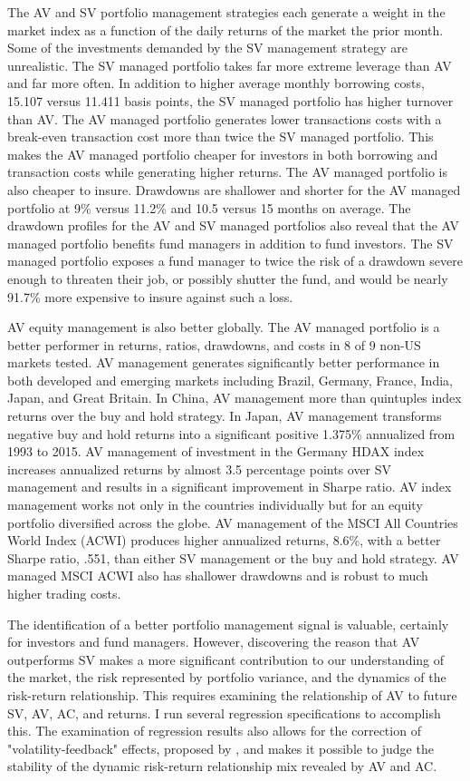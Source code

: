 The AV and SV portfolio management strategies each generate a weight in the market index as a function of the daily returns of the market the prior month. Some of the investments demanded by the SV management strategy are unrealistic. The SV managed portfolio takes far more extreme leverage than AV and far more often. In addition to higher average monthly borrowing costs, 15.107 versus 11.411 basis points, the SV managed portfolio has higher turnover than AV. The AV managed portfolio generates lower transactions costs with a break-even transaction cost more than twice the SV managed portfolio. This makes the AV managed portfolio cheaper for investors in both borrowing and transaction costs while generating higher returns. The AV managed portfolio is also cheaper to insure. Drawdowns are shallower and shorter for the AV managed portfolio at 9\% versus 11.2\% and 10.5 versus 15 months on average. The drawdown profiles for the AV and SV managed portfolios also reveal that the AV managed portfolio benefits fund managers in addition to fund investors. The SV managed portfolio exposes a fund manager to twice the risk of a drawdown severe enough to threaten their job, or possibly shutter the fund, and would be nearly 91.7\% more expensive to insure against such a loss.

AV equity management is also better globally. The AV managed portfolio is a better performer in returns, ratios, drawdowns, and costs in 8 of 9 non-US markets tested. AV management generates significantly better performance in both developed and emerging markets including Brazil, Germany, France, India, Japan, and Great Britain. In China, AV management more than quintuples index returns over the buy and hold strategy. In Japan, AV management transforms negative buy and hold returns into a significant positive 1.375\% annualized from 1993 to 2015. AV management of investment in the Germany HDAX index increases annualized returns by almost 3.5 percentage points over SV management and results in a significant improvement in Sharpe ratio. AV index management works not only in the countries individually but for an equity portfolio diversified across the globe. AV management of the MSCI All Countries World Index (ACWI) produces higher annualized returns, 8.6\%, with a better Sharpe ratio, .551, than either SV management or the buy and hold strategy. AV managed MSCI ACWI also has shallower drawdowns and is robust to much higher trading costs. 

The identification of a better portfolio management signal is valuable, certainly for investors and fund managers. However, discovering the reason that AV outperforms SV makes a more significant contribution to our understanding of the market, the risk represented by portfolio variance, and the dynamics of the risk-return relationship. This requires examining the relationship of AV to future SV, AV, AC, and returns. I run several regression specifications to accomplish this. The examination of regression results also allows for the correction of "volatility-feedback" effects, proposed by \citet{campbell_no_1992}, and makes it possible to judge the stability of the dynamic risk-return relationship mix revealed by AV and AC.

